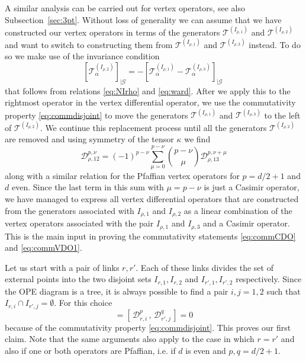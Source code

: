 \documentclass{article}
\def\cG{\mathcal{G}}
\begin{document}
A similar analysis can be carried out for vertex operators, see also Subsection~\ref{sec:3pt}. 
Without loss of generality we can assume that we have constructed our 
vertex operators in terms of the generators $\mathcal{T}^{(I_{\rho,1})}$ and 
$\mathcal{T}^{(I_{\rho,2})}$ and want to switch to constructing them from 
$\mathcal{T}^{(I_{\rho,1})}$ and $\mathcal{T}^{(I_{\rho,3})}$ instead. To do 
so we make use of the invariance condition  
\begin{equation} \label{eq:T213} 
\left[\mathcal{T}^{(I_{\rho,2})}_{\alpha}\right]_{|\cG} = - 
\left[\mathcal{T}^{(I_{\rho,1})}_{\alpha} - 
\mathcal{T}^{(I_{\rho,3})}_{\alpha}\right]_{|\cG}\ 
\end{equation} 
that follows from relations \eqref{eq:NIrho} and \eqref{eq:ward}. After we
apply this to the rightmost operator in the vertex differential operator, we use 
the commutativity property \eqref{eq:commdisjoint} to move the generators 
$\mathcal{T}^{(I_{\rho,1})}$ and $\mathcal{T}^{(I_{\rho,3})}$ to the left of 
$\mathcal{T}^{(I_{\rho,2})}$. We continue this replacement process until all 
the generators $\mathcal{T}^{(I_{\rho,2})}$ are removed and using symmetry 
of the tensor $\kappa$ we find 
\begin{equation} 
 \mathcal{D}^{p,\nu}_{\rho,12}
= (-1)^{p-\nu} \sum_{\mu=0}^{p-\nu} \binom{p-\nu}{\mu} 
  \mathcal{D}^{p,\nu+\mu}_{\rho,13}
\end{equation} 
along with a similar relation for the Pfaffian vertex operators for $p=d/2+1$ and $d$ even. 
Since the last term in this sum with $\mu = p-\nu$ is just a Casimir operator, we 
have managed to express all vertex differential operators that are constructed from 
the generators associated with $I_{\rho,1}$ and $I_{\rho,2}$ as a linear combination 
of the vertex operators associated with the pair $I_{\rho,1}$ and 
$I_{\rho,3}$ and a Casimir operator. This is the main input in proving the 
commutativity statements \eqref{eq:commCDO} and \eqref{eq:commVDO1}. 
\medskip  
 
Let us start with a pair of links $r,r'$. Each of these links divides the 
set of external points into the two disjoint sets $I_{r,1}, I_{r,2}$ and 
$I_{r',1}, I_{r',2}$ respectively. Since the OPE diagram is a tree, it is always possible 
to find a pair $i,j = 1,2$ such that $I_{r,i} \cap I_{r',j} = \emptyset$. 
For this choice 
\begin{equation}
[\, \mathcal{D}^p_r\,, \, \mathcal{D}^q_{r'} \, ] = 
[\, \mathcal{D}^p_{r,i}\,, \, \mathcal{D}^q_{r',j} \, ]
 = 0 
\end{equation}
because of the commutativity property \eqref{eq:commdisjoint}. This proves 
our first claim. Note that the same arguments also apply to the case in which $r=r'$ and also if one or both operators are Pfaffian, i.e. if $d$ is 
even and $p,q = d/2+1$. 
\end{document}
